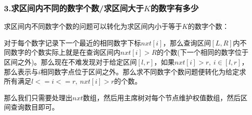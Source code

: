 \documentclass[]{article}
\begin{document}
\hypertarget{ux6c42ux533aux95f4ux5185ux4e0dux540cux7684ux6570ux5b57ux4e2aux6570ux6c42ux533aux95f4ux5927ux4e8ekux7684ux6570ux5b57ux6709ux591aux5c11}{%
\subsubsection{\texorpdfstring{3.求区间内不同的数字个数/求区间大于\(K\)的数字有多少}{3.求区间内不同的数字个数/求区间大于K的数字有多少}}\label{ux6c42ux533aux95f4ux5185ux4e0dux540cux7684ux6570ux5b57ux4e2aux6570ux6c42ux533aux95f4ux5927ux4e8ekux7684ux6570ux5b57ux6709ux591aux5c11}}

求区间内不同数字个数的问题可以转化为求区间内小于等于\(K\)的数字个数：

对于每个数字记录下一个最近的相同数字下标\(nxt[i]\)，那么查询区间\([L,R]\)内不同数字的个数实际上就是在查询区间内\(nxt[i] > R\)的个数(下一个相同的数字位于区间之外)。那么现在不难发现对于给定区间\([l,r]\)，如果\(nxt[i] > r,\ i \in [l,r]\)，那么表示与\(i\)相同数字点位于区间之外。那么求不同数字个数问题便转化为给定求所有满足\(l<=i<=r,\ nxt[i]>r\)的个数。

那么我们只需要处理出\(nxt\)数组，然后用主席树对每个节点维护权值数组，然后区间查询数目即可。
\end{document}
